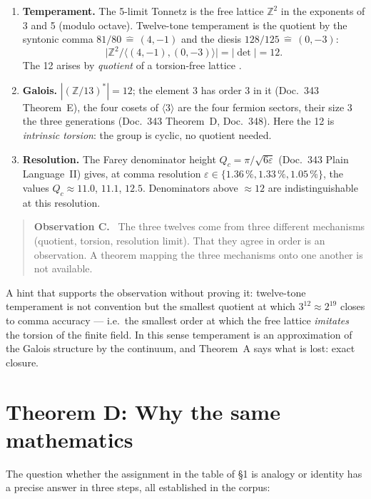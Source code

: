 \begin{enumerate}
\item \textbf{Temperament.} The 5-limit Tonnetz is the free lattice
  $\mathbb{Z}^2$ in the exponents of 3 and 5 (modulo octave). Twelve-tone
  temperament is the quotient by the syntonic comma
  $81/80\,\widehat{=}\,(4,-1)$ and the diesis $128/125\,\widehat{=}\,(0,-3)$:
  \[
    \bigl|\mathbb{Z}^2/\langle(4,-1),(0,-3)\rangle\bigr| = |\det| = 12 .
  \]
  The 12 arises by \emph{quotient} of a torsion-free lattice \EM.
\item \textbf{Galois.} $|(\mathbb{Z}/13)^*|=12$; the element 3 has order 3
  in it (Doc.~343 Theorem~E), the four cosets of $\langle3\rangle$ are the
  four fermion sectors, their size 3 the three generations (Doc.~343
  Theorem~D, Doc.~348). Here the 12 is \emph{intrinsic torsion}: the group
  is cyclic, no quotient needed.
\item \textbf{Resolution.} The Farey denominator height
  $Q_c=\pi/\sqrt{6\varepsilon}$ (Doc.~343 Plain Language~II) gives, at
  comma resolution $\varepsilon\in\{1.36\,\%, 1.33\,\%, 1.05\,\%\}$, the
  values $Q_c\approx11.0$, $11.1$, $12.5$. Denominators above $\approx12$
  are indistinguishable at this resolution.
\end{enumerate}

\begin{quote}
\textbf{Observation C.} \SM\ The three twelves come from three different
mechanisms (quotient, torsion, resolution limit). That they agree in order
is an observation. A theorem mapping the three mechanisms onto one another
is not available.
\end{quote}

A hint that supports the observation without proving it: twelve-tone
temperament is not convention but the smallest quotient at which
$3^{12}\approx2^{19}$ closes to comma accuracy --- i.e.\ the smallest
order at which the free lattice \emph{imitates} the torsion of the finite
field. In this sense temperament is an approximation of the Galois
structure by the continuum, and Theorem~A says what is lost: exact closure.

\section{Theorem D: Why the same mathematics}

The question whether the assignment in the table of §1 is analogy or
identity has a precise answer in three steps, all established in the corpus:

